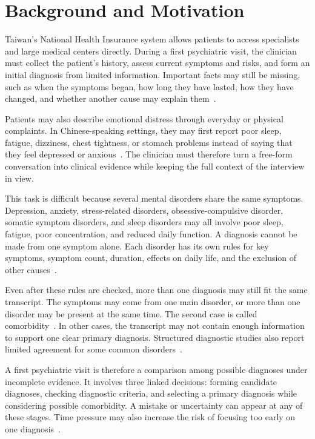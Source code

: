 \documentclass[12pt,a4paper,oneside]{report}
\begin{document}
\section{Background and Motivation}

Taiwan's National Health Insurance system allows patients to access specialists and large medical centers directly. During a first psychiatric visit, the clinician must collect the patient's history, assess current symptoms and risks, and form an initial diagnosis from limited information. Important facts may still be missing, such as when the symptoms began, how long they have lasted, how they have changed, and whether another cause may explain them~\citep{lin2020outpatient}.

Patients may also describe emotional distress through everyday or physical complaints. In Chinese-speaking settings, they may first report poor sleep, fatigue, dizziness, chest tightness, or stomach problems instead of saying that they feel depressed or anxious~\citep{kleinman1982neurasthenia,ryder2008somatic}. The clinician must therefore turn a free-form conversation into clinical evidence while keeping the full context of the interview in view.

This task is difficult because several mental disorders share the same symptoms. Depression, anxiety, stress-related disorders, obsessive-compulsive disorder, somatic symptom disorders, and sleep disorders may all involve poor sleep, fatigue, poor concentration, and reduced daily function. A diagnosis cannot be made from one symptom alone. Each disorder has its own rules for key symptoms, symptom count, duration, effects on daily life, and the exclusion of other causes~\citep{who2019icd10}.

Even after these rules are checked, more than one diagnosis may still fit the same transcript. The symptoms may come from one main disorder, or more than one disorder may be present at the same time. The second case is called comorbidity~\citep{brown2001comorbidity}. In other cases, the transcript may not contain enough information to support one clear primary diagnosis. Structured diagnostic studies also report limited agreement for some common disorders~\citep{regier2013dsm5}.

A first psychiatric visit is therefore a comparison among possible diagnoses under incomplete evidence. It involves three linked decisions: forming candidate diagnoses, checking diagnostic criteria, and selecting a primary diagnosis while considering possible comorbidity. A mistake or uncertainty can appear at any of these stages. Time pressure may also increase the risk of focusing too early on one diagnosis~\citep{croskerry2003cognitive}.
\end{document}
